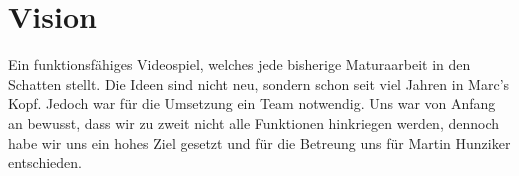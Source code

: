 \chapter{Vision}

Ein funktionsfähiges Videospiel, welches jede bisherige Maturaarbeit in den Schatten stellt.
Die Ideen sind nicht neu, sondern schon seit viel Jahren in Marc's Kopf.
Jedoch war für die Umsetzung ein Team notwendig. Uns war von Anfang an bewusst,
dass wir zu zweit nicht alle Funktionen hinkriegen werden, dennoch habe wir uns ein hohes Ziel gesetzt
und für die Betreung uns für Martin Hunziker entschieden.